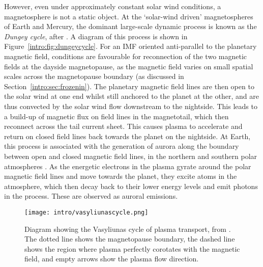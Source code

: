 However, even under approximately constant solar wind conditions, a magnetosphere is not a static object. At the `solar-wind driven' magnetospheres of Earth and Mercury, the dominant large-scale dynamic process is known as the \textit{Dungey cycle}, after \citet{dungey1961}. A diagram of this process is shown in Figure~\ref{intro:fig:dungeycycle}. For an IMF oriented anti-parallel to the planetary magnetic field, conditions are favourable for reconnection of the two magnetic fields at the dayside magnetopause, as the magnetic field varies on small spatial scales across the magnetopause boundary (as discussed in Section~\ref{intro:sec:frozenin}). The planetary magnetic field lines are then open to the solar wind at one end whilst still anchored to the planet at the other, and are thus convected by the solar wind flow downstream to the nightside. This leads to a build-up of magnetic flux on field lines in the magnetotail, which then reconnect across the tail current sheet. This causes plasma to accelerate and return on closed field lines back towards the planet on the nightside. At Earth, this process is associated with the generation of aurora along the boundary between open and closed magnetic field lines, in the northern and southern polar atmospheres \citep[e.g.][]{milan2007}. As the energetic electrons in the plasma gyrate around the polar magnetic field lines and move towards the planet, they excite atoms in the atmosphere, which then decay back to their lower energy levels and emit photons in the process. These are observed as auroral emissions.

\begin{figure}
\centering
\noindent\texttt{[image: intro/vasyliunascycle.png]}
\caption[Diagram of the Vasyliunas cycle.]{Diagram showing the Vasyliunas cycle of plasma transport, from \citet{vasyliunas1983}. The dotted line shows the magnetopause boundary, the dashed line shows the region where plasma perfectly corotates with the magnetic field, and empty arrows show the plasma flow direction.}
\label{intro:fig:vasyliunascycle}
\end{figure}

